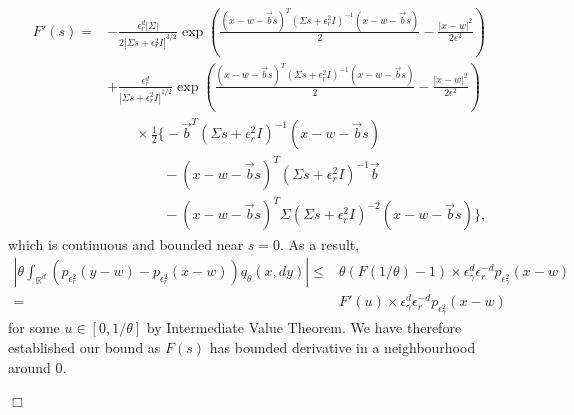 \documentclass[12pt]{article}
\newenvironment {proof}{{\noindent\bf Proof }}{\hfill $\Box$ \medskip}
\newcommand{\meanq}{\vec b}    %
\newcommand{\covq}{\Sigma}     %
\begin{document}
\begin{proof}
\begin{align}
F'(s)=&  -\frac{\epsilon^d_r |\covq|}
        {2\left|\covq s +  \epsilon^2_r I \right|^{3/2}}
        \exp \left(
                    \frac{(x-w-\meanq s)^{T}
                        (\covq s +  \epsilon^2_r I)^{-1}
                        (x-w-\meanq s)}{2}
                        -\frac{|x-w|^2}{2\epsilon^2}
            \right)\\
    &+\frac{\epsilon^d_r }
        {\left|\covq s +  \epsilon^2_r I \right|^{1/2}}
        \exp \left(
                    \frac{(x-w-\meanq s)^{T}
                        (\covq s +  \epsilon^2_r I)^{-1}
                        (x-w-\meanq s)}{2}
                        -\frac{|x-w|^2}{2\epsilon^2}
            \right) \\
    & \qquad \times \frac{1}{2}
                    \bigg\{
                         -\meanq^{T}(\covq s + \epsilon^2_r I)^{-1}(x-w-\meanq s)\\
    & \qquad \qquad     -(x-w-\meanq s)^{T}
                        (\covq s +  \epsilon^2_r I)^{-1}\meanq\\
    & \qquad \qquad     -(x-w-\meanq s)^{T}
                        \covq(\covq s +  \epsilon^2_r I)^{-2}(x-w-\meanq s)                    
                    \bigg\},
\end{align}
which is continuous and bounded near $s=0$.
As a result,
\begin{align}
\left| \theta \int_{\mathbb{R}^d}
                \left(p_{\epsilon^2_r}(y-w)
                        -p_{\epsilon^2_r}(x-w)
                \right)
                q_\theta(x,dy)
        \right|
        \leq&  \theta \left(F\left(1 / \theta \right)-1\right) 
                \times \epsilon_\gamma^d \epsilon_r^{-d}
                p_{\epsilon^2_\gamma}(x-w)\\
         =&  F'(u) 
                \times \epsilon_\gamma^d \epsilon_r^{-d}
                p_{\epsilon^2_\gamma}(x-w)        
\end{align}
for some $u \in [0, 1/\theta]$ by Intermediate Value Theorem. We have therefore established our bound as $F(s)$ has bounded derivative in a neighbourhood around $0$.


\end{proof}
\end{document}
